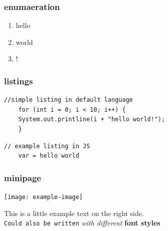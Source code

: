 \subsubsection{enumaeration}
\begin{enumerate}
    \item hello
    \item world
    \item !
\end{enumerate}

\subsubsection{listings}
\begin{lstlisting}
//simple listing in default language
    for (int i = 0; i < 10; i++) {
    System.out.printline(i + "hello world!");
    }
\end{lstlisting}

\begin{lstlisting}[style=JavaScript]
// example listing in JS
    var = hello world
\end{lstlisting}


\subsubsection{minipage}
\begin{minipage}{0.5\linewidth}
    \begin{center}
        \texttt{[image: example-image]}
        \vspace{-8pt}
    \end{center}
\end{minipage}
\begin{minipage}{0.45\linewidth}
    This is a little example text on the right side.\\
    \texttt{Could also be written} \textit{with different} \textbf{font styles}
\end{minipage}
